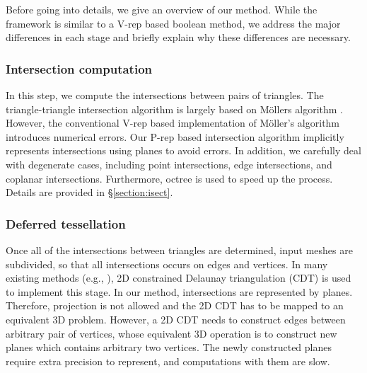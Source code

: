 Before going into details, we give an overview of our method. While the framework is similar to a V-rep based boolean method, we address the major differences in each stage and briefly explain why these differences are necessary.

\subsubsection{Intersection computation}

In this step, we compute the intersections between pairs of triangles. The triangle-triangle intersection algorithm is largely based on M\"{o}llers algorithm \cite{moller1997fast}. However, the conventional V-rep based implementation of M\"{o}ller's algorithm introduces numerical errors. Our P-rep based intersection algorithm implicitly represents intersections using planes to avoid errors. In addition, we carefully deal with degenerate cases, including point intersections, edge intersections, and coplanar intersections. Furthermore, octree is used to speed up the process. Details are provided in \S\ref{section:isect}.

\subsubsection{Deferred tessellation}


Once all of the intersections between triangles are determined, input meshes are subdivided, so that all intersections occurs on edges and vertices. In many existing methods (e.g., \cite{ogayar2015deferred,zhou2016mesh}), 2D constrained Delaunay triangulation (CDT) \cite{chew1989constrained}\cite{de1992line} is used to implement this stage. In our method, intersections are represented by planes. Therefore, projection is not allowed and the 2D CDT has to be mapped to an equivalent 3D problem. However, a 2D CDT needs to construct edges between arbitrary pair of vertices, whose equivalent 3D operation is to construct new planes which contains arbitrary two vertices. The newly constructed planes require extra precision to represent, and computations with them are slow.

